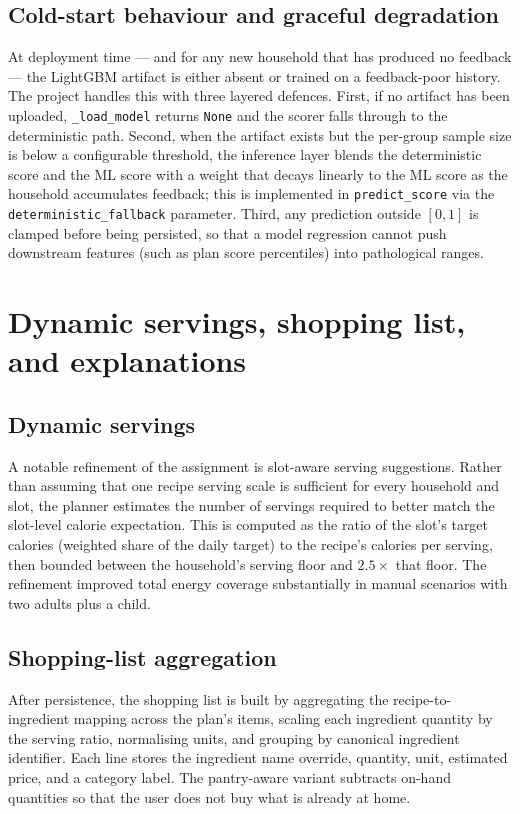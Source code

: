 \subsection{Cold-start behaviour and graceful degradation}

At deployment time --- and for any new household that has produced no feedback --- the LightGBM artifact is either absent or trained on a feedback-poor history. The project handles this with three layered defences. First, if no artifact has been uploaded, \texttt{\_load\_model} returns \texttt{None} and the scorer falls through to the deterministic path. Second, when the artifact exists but the per-group sample size is below a configurable threshold, the inference layer blends the deterministic score and the ML score with a weight that decays linearly to the ML score as the household accumulates feedback; this is implemented in \texttt{predict\_score} via the \texttt{deterministic\_fallback} parameter. Third, any prediction outside $[0, 1]$ is clamped before being persisted, so that a model regression cannot push downstream features (such as plan score percentiles) into pathological ranges.

\section{Dynamic servings, shopping list, and explanations}

\subsection{Dynamic servings}

A notable refinement of the assignment is slot-aware serving suggestions. Rather than assuming that one recipe serving scale is sufficient for every household and slot, the planner estimates the number of servings required to better match the slot-level calorie expectation. This is computed as the ratio of the slot's target calories (weighted share of the daily target) to the recipe's calories per serving, then bounded between the household's serving floor and $2.5\times$ that floor. The refinement improved total energy coverage substantially in manual scenarios with two adults plus a child.

\subsection{Shopping-list aggregation}

After persistence, the shopping list is built by aggregating the recipe-to-ingredient mapping across the plan's items, scaling each ingredient quantity by the serving ratio, normalising units, and grouping by canonical ingredient identifier. Each line stores the ingredient name override, quantity, unit, estimated price, and a category label. The pantry-aware variant subtracts on-hand quantities so that the user does not buy what is already at home.

